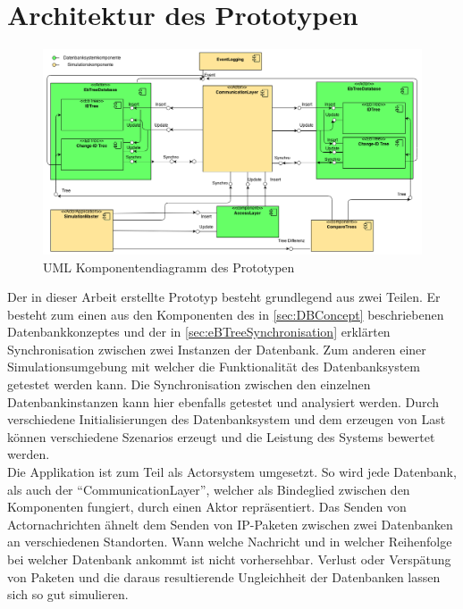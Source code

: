 \documentclass[a4paper,11pt,oneside,%
headsepline,												%
footsepline,												%
bibtotocnumbered									%
]{scrreprt}
\begin{document}
\section{Architektur des Prototypen}
\begin{figure}[h!]
  \begin{center}
    \includegraphics[width=1.0\linewidth]{bilder/prototyp_component_diagram.png}
  \end{center}
 \caption{UML Komponentendiagramm des Prototypen}
\end{figure}
Der in dieser Arbeit erstellte Prototyp besteht grundlegend aus zwei Teilen. Er besteht zum einen aus den Komponenten des in \autoref{sec:DBConcept} beschriebenen Datenbankkonzeptes und der in \autoref{sec:eBTreeSynchronisation} erklärten Synchronisation zwischen zwei Instanzen der Datenbank. Zum anderen einer Simulationsumgebung mit welcher die Funktionalität des Datenbanksystem getestet werden kann. Die Synchronisation zwischen den einzelnen Datenbankinstanzen kann hier ebenfalls getestet und analysiert werden. Durch verschiedene Initialisierungen des Datenbanksystem und dem erzeugen von Last  können verschiedene Szenarios erzeugt und die Leistung des Systems bewertet werden. \\

Die Applikation ist zum Teil als Actorsystem umgesetzt. So wird jede Datenbank, als auch der \enquote{CommunicationLayer}, welcher als Bindeglied zwischen den Komponenten fungiert, durch einen Aktor repräsentiert.
Das Senden von Actornachrichten ähnelt dem Senden von IP-Paketen zwischen zwei Datenbanken an verschiedenen Standorten. Wann welche Nachricht und in welcher Reihenfolge bei welcher Datenbank ankommt ist nicht vorhersehbar. Verlust oder Verspätung von Paketen und die daraus resultierende Ungleichheit der Datenbanken lassen sich so gut simulieren.
\end{document}
